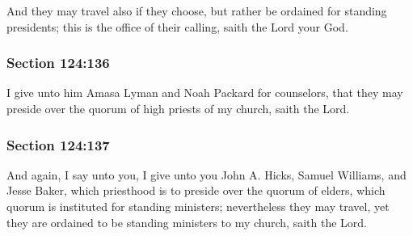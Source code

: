 		And they may travel also if they choose, but rather be ordained for standing presidents; this is the office of their calling, saith the Lord your God.


	\subsubsection{Section 124:136} %
		\label{DC124-136}

		I give unto him Amasa Lyman and Noah Packard for counselors, that they may preside over the quorum of high priests of my church, saith the Lord.


	\subsubsection{Section 124:137} %
		\label{DC124-137}

		And again, I say unto you, I give unto you John A. Hicks, Samuel Williams, and Jesse Baker, which priesthood is to preside over the quorum of elders, which quorum is instituted for standing ministers; nevertheless they may travel, yet they are ordained to be standing ministers to my church, saith the Lord.


